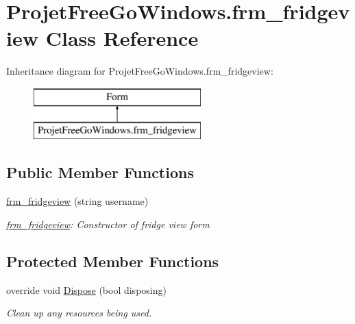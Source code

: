 \hypertarget{class_projet_free_go_windows_1_1frm__fridgeview}{}\section{Projet\+Free\+Go\+Windows.\+frm\+\_\+fridgeview Class Reference}
\label{class_projet_free_go_windows_1_1frm__fridgeview}
Inheritance diagram for Projet\+Free\+Go\+Windows.\+frm\+\_\+fridgeview\+:\begin{figure}[H]
\begin{center}
\leavevmode
\includegraphics[height=2.000000cm]{class_projet_free_go_windows_1_1frm__fridgeview}
\end{center}
\end{figure}
\subsection*{Public Member Functions}
\begin{DoxyCompactItemize}
\item 
\hyperlink{class_projet_free_go_windows_1_1frm__fridgeview_afd443a535fe33fc18661498c9103c3ee}{frm\+\_\+fridgeview} (string username)
\begin{DoxyCompactList}\small\item\em \hyperlink{class_projet_free_go_windows_1_1frm__fridgeview}{frm\+\_\+fridgeview}\+: Constructor of fridge view form \end{DoxyCompactList}\end{DoxyCompactItemize}
\subsection*{Protected Member Functions}
\begin{DoxyCompactItemize}
\item 
override void \hyperlink{class_projet_free_go_windows_1_1frm__fridgeview_ad76475628c30fdf4d69041ae0b660323}{Dispose} (bool disposing)
\begin{DoxyCompactList}\small\item\em Clean up any resources being used. \end{DoxyCompactList}\end{DoxyCompactItemize}


